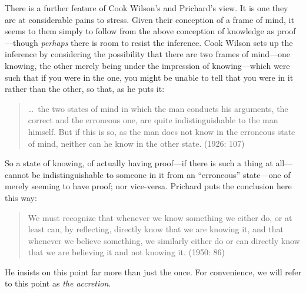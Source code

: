 There is a further feature of Cook Wilson's and Prichard's view. It is one they are at considerable pains to stress. Given their conception of a frame of mind, it seems to them simply to follow from the above conception of knowledge as proof---though \emph{perhaps} there is room to resist the inference. Cook Wilson sets up the inference by considering the possibility that there are two frames of mind---one knowing, the other merely being under the impression of knowing---which were such that if you were in the one, you might be unable to tell that you were in it rather than the other, so that, as he puts it:
\begin{quote}
	\ldots\ the two states of mind in which the man conducts his arguments, the correct and the erroneous one, are quite indistinguishable to the man himself. But if this is so, as the man does not know in the erroneous state of mind, neither can he know in the other state. (1926: 107)
\end{quote}
So a state of knowing, of actually having proof---if there is such a thing at all---cannot be indistinguishable to someone in it from an ``erroneous'' state---one of merely seeming to have proof; nor vice-versa. Prichard puts the conclusion here this way:
\begin{quote}
	We must recognize that whenever we know something we either do, or at least can, by reflecting, directly know that we are knowing it, and that whenever we believe something, we similarly either do or can directly know that we are believing it and not knowing it. (1950: 86)
\end{quote}
He insists on this point far more than just the once. For convenience, we will refer to this point as \emph{the accretion}.

